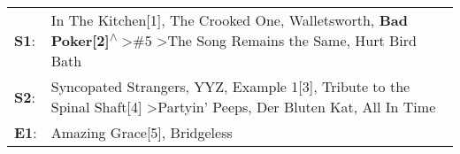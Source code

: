 \begin{supertabular}{p{0.03\textwidth}p{0.92\textwidth}}
 \textbf{S1}:  &  In The Kitchen[1]\textsuperscript{}, \enspace The Crooked One\textsuperscript{}, \enspace Walletsworth\textsuperscript{}, \enspace \textbf{Bad Poker[2]\textsuperscript{$\wedge$}} \textgreater \enspace \#5\textsuperscript{} \textgreater \enspace The Song Remains the Same\textsuperscript{}, \enspace Hurt Bird Bath\textsuperscript{}  \enspace  \\
 \textbf{S2}:  &                         Syncopated Strangers\textsuperscript{}, \enspace YYZ\textsuperscript{}, \enspace Example 1[3]\textsuperscript{}, \enspace Tribute to the Spinal Shaft[4]\textsuperscript{} \textgreater \enspace Partyin' Peeps\textsuperscript{}, \enspace Der Bluten Kat\textsuperscript{}, \enspace All In Time\textsuperscript{}  \enspace  \\
 \textbf{E1}:  &                                                                                                                                                                                                                                                                    Amazing Grace[5]\textsuperscript{}, \enspace Bridgeless\textsuperscript{}  \enspace  \\
\end{supertabular}
